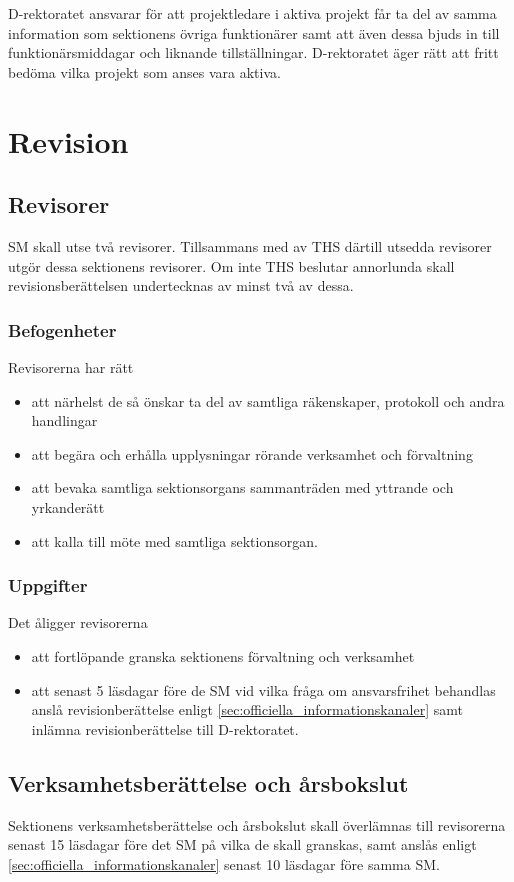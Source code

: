 \documentclass{dgovdoc}
\begin{document}
D-rektoratet ansvarar för att projektledare i aktiva projekt får ta del av
samma information som sektionens övriga funktionärer samt att även dessa bjuds
in till funktionärsmiddagar och liknande tillställningar. D-rektoratet äger
rätt att fritt bedöma vilka projekt som anses vara aktiva.

\section{Revision}

\subsection{Revisorer}
\label{sec:revisorer}

SM skall utse två revisorer. Tillsammans med av THS därtill utsedda revisorer
utgör dessa sektionens revisorer. Om inte THS beslutar annorlunda skall
revisionsberättelsen undertecknas av minst två av dessa.

\subsubsection{Befogenheter}

Revisorerna har rätt

\begin{itemize}
  \item att närhelst de så önskar ta del av samtliga räkenskaper, protokoll och
    andra handlingar
  \item att begära och erhålla upplysningar rörande verksamhet och förvaltning
  \item att bevaka samtliga sektionsorgans sammanträden med yttrande och
    yrkanderätt
  \item att kalla till möte med samtliga sektionsorgan.
\end{itemize}

\subsubsection{Uppgifter}

Det åligger revisorerna

\begin{itemize}
  \item att fortlöpande granska sektionens förvaltning och verksamhet
  \item att senast 5 läsdagar före de SM vid vilka fråga om ansvarsfrihet
    behandlas anslå revisionberättelse enligt
    \ref{sec:officiella_informationskanaler} samt inlämna revisionberättelse
    till D-rektoratet.
\end{itemize}

\subsection{Verksamhetsberättelse och årsbokslut}

Sektionens verksamhetsberättelse och årsbokslut skall överlämnas till
revisorerna senast 15 läsdagar före det SM på vilka de skall granskas, samt
anslås enligt \ref{sec:officiella_informationskanaler} senast 10 läsdagar före
samma SM.
\end{document}
